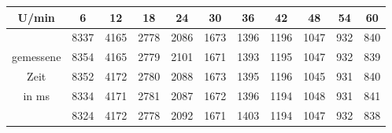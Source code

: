\begin{center}
\begin{tabular}{c||c|c|c|c|c|c|c|c|c|c}
	U/min & 6 & 12 & 18 & 24 & 30 & 36 & 42 & 48 & 54 & 60 \\
	\hline
	& 8337 & 4165 & 2778 & 2086 & 1673 & 1396 & 1196 & 1047 & 932 & 840 \\
	gemessene & 8354 & 4165 & 2779 & 2101 & 1671 & 1393 & 1195 & 1047 & 932 & 839 \\
	Zeit& 8352 & 4172 & 2780 & 2088 & 1673 & 1395 & 1196 & 1045 & 931 & 840 \\
	in ms& 8334 & 4171 & 2781 & 2087 & 1672 & 1396 & 1194 & 1048 & 931 & 841 \\
	& 8324 & 4172 & 2778 & 2092 & 1671 & 1403 & 1194 & 1047 & 932 & 838 \\
\end{tabular}
\end{center}